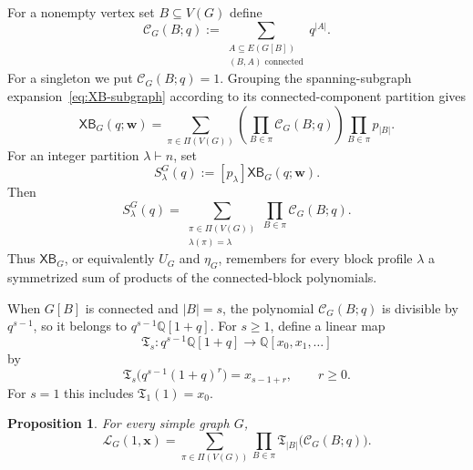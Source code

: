 \documentclass[11pt]{article}
\theoremstyle{plain}
\newtheorem{proposition}[theorem]{Proposition}
\theoremstyle{definition}
\renewcommand{\mathcal}{\mathscr}
\newcommand{\LL}{\mathcal{L}}    %
\newcommand{\cC}{\mathcal{C}}    %
\newcommand{\fT}{\mathfrak T}    %
\newcommand{\bw}{\mathbf{w}}
\newcommand{\bx}{\mathbf{x}}
\newcommand{\XB}{\mathsf{XB}} %
\newcommand{\QQ}{\mathbb Q}
\numberwithin{equation}{section}
\begin{document}
For a nonempty vertex set $B\subseteq V(G)$ define
\begin{equation}\label{eq:connected-block-polynomial}
 \cC_G(B;q) := \sum_{\substack{A\subseteq E(G[B])\\(B,A)\text{ connected}}} q^{|A|}.
\end{equation}
For a singleton we put $\cC_G(B;q)=1$.  Grouping the spanning-subgraph
expansion~\eqref{eq:XB-subgraph} according to its connected-component partition gives
\begin{equation}\label{eq:XB-connected-block-expansion}
   \XB_G(q;\bw)
   =
   \sum_{\pi\in\Pi(V(G))}
   \left(\prod_{B\in\pi}\cC_G(B;q)\right)
   \prod_{B\in\pi}p_{|B|}.
\end{equation}
For an integer partition $\lambda\vdash n$, set
\begin{equation}\label{eq:S-lambda-definition}
   S^G_\lambda(q):=[p_\lambda]\XB_G(q;\bw).
\end{equation}
Then
\begin{equation}\label{eq:S-lambda-blocks}
   S^G_\lambda(q)
   =
   \sum_{\substack{\pi\in\Pi(V(G))\\\lambda(\pi)=\lambda}}
   \prod_{B\in\pi}\cC_G(B;q).
\end{equation}
Thus $\XB_G$, or equivalently $U_G$ and $\eta_G$, remembers for every block
profile $\lambda$ a symmetrized sum of products of the connected-block
polynomials.

When $G[B]$ is connected and $|B|=s$, the polynomial $\cC_G(B;q)$ is divisible by $q^{s-1}$,
so it belongs to $q^{s-1}\QQ[1+q]$.  For $s\ge 1$, define a linear map
\begin{equation}\label{eq:block-transform}
   \fT_s:q^{s-1}\QQ[1+q]
   \longrightarrow
   \QQ[x_0,x_1,\ldots]
\end{equation}
by
\begin{equation}\label{eq:block-transform-on-basis}
   \fT_s\bigl(q^{s-1}(1+q)^r\bigr)
   =x_{s-1+r},
   \qquad r\ge 0.
\end{equation}
For $s=1$ this includes $\fT_1(1)=x_0$.

\begin{proposition}\label{prop:block-transform-L}
For every simple graph $G$,
\begin{equation}\label{eq:L-block-transform}
   \LL_G(1,\bx)
   =
   \sum_{\pi\in\Pi(V(G))}
   \prod_{B\in\pi}
   \fT_{|B|}\bigl(\cC_G(B;q)\bigr).
\end{equation}
\end{proposition}
\end{document}
